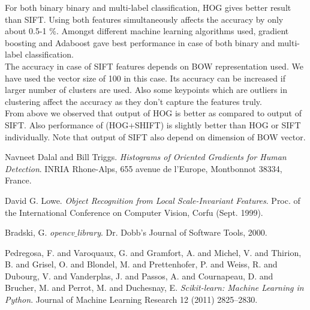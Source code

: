 \documentclass[paper=a4, fontsize=11pt]{scrartcl}
\numberwithin{equation}{section}		%
\numberwithin{figure}{section}			%
\numberwithin{table}{section}				%
\begin{document}
\noindent For both binary binary and multi-label classification, HOG gives better result than SIFT. Using both features simultaneously affects the accuracy by only about 0.5-1 \%. Amongst different machine learning algorithms used, gradient boosting and Adaboost gave best performance in case of both binary and multi-label classification.\\

\noindent The accuracy in case of SIFT features depends on BOW representation used. We have used the vector size of 100 in this case. Its accuracy can be increased if larger number  of clusters are used. Also some keypoints which are outliers in clustering affect the accuracy as they don't capture the features truly.\\

\noindent From above we observed that output of HOG is better as compared to output of SIFT. Also performance of (HOG+SHIFT) is slightly better than HOG or SIFT individually. Note that output of SIFT also depend on dimension of BOW vector. 




\pagebreak
\begin{thebibliography}{3}
 Navneet Dalal and Bill Triggs. \textit {Histograms of Oriented Gradients for Human Detection}. INRIA Rhone-Alps, 655 avenue de l'Europe, Montbonnot 38334, France.

 David G. Lowe. \textit {Object Recognition from Local Scale-Invariant Features}. Proc. of the International Conference on
Computer Vision, Corfu (Sept. 1999).

 Bradski, G. \textit{opencv$\_$library}. Dr. Dobb's Journal of Software Tools, 2000.

 Pedregosa, F. and Varoquaux, G. and Gramfort, A. and Michel, V. and Thirion, B. and Grisel, O. and Blondel, M. and Prettenhofer, P. and Weiss, R. and Dubourg, V. and Vanderplas, J. and Passos, A. and Cournapeau, D. and Brucher, M. and Perrot, M. and Duchesnay, E. \textit {Scikit-learn: Machine Learning in {P}ython}. Journal of Machine Learning Research 12 (2011) 2825--2830.


\end{thebibliography}
\end{document}
